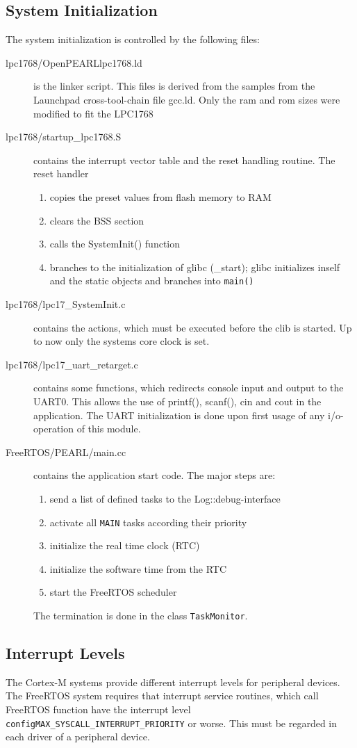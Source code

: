\subsection{System Initialization}
The system initialization  is controlled by the following files:
\begin{description}
\item[lpc1768/OpenPEARLlpc1768.ld] is the linker script. This files is derived from
   the samples from the Launchpad cross-tool-chain file gcc.ld. 
   Only the ram and rom sizes were modified to fit the LPC1768 
\item[lpc1768/startup\_lpc1768.S] contains the interrupt vector table and the 
   reset handling routine. The reset handler 
   \begin{enumerate}
   \item copies the preset values from flash memory to RAM
   \item clears the BSS section 
   \item  calls the SystemInit() function
   \item  branches to the initialization of glibc (\_start); glibc
      initializes inself and the static objects and branches into \verb|main()|
   \end{enumerate}
\item[lpc1768/lpc17\_SystemInit.c] contains the actions, which must be executed
   before the clib is started. Up to now only the systems core clock is 
   set.
\item [lpc1768/lpc17\_uart\_retarget.c] contains some functions, which redirects console 
   input and output to the UART0.  This allows the use of printf(), 
   scanf(), cin and cout in the application. The UART initialization is done 
   upon first usage of any i/o-operation of this module.
\item[FreeRTOS/PEARL/main.cc] contains the application start code.
 The major steps are:
  \begin{enumerate}
  \item send a list of defined tasks to the Log::debug-interface
  \item activate all \verb|MAIN| tasks according their priority
  \item initialize the real time clock (RTC)
  \item initialize the software time from the RTC
  \item start the FreeRTOS scheduler 
  \end{enumerate}
  The termination is done in the class \verb|TaskMonitor|. 
\end{description}

\subsection{Interrupt Levels}
The Cortex-M systems provide different interrupt levels for peripheral devices.
The FreeRTOS system requires that interrupt service routines, which call
FreeRTOS function have the interrupt level 
\texttt{configMAX\_SYSCALL\_INTERRUPT\_PRIORITY} or worse. 
This must be regarded in each driver of a peripheral device.



